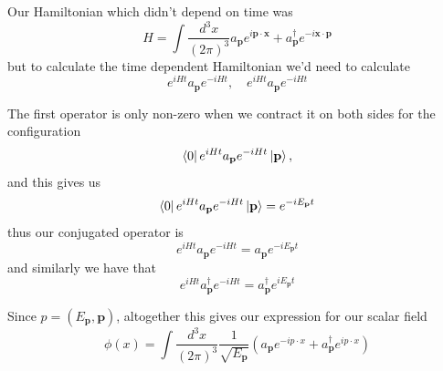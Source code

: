 \documentclass[11pt, oneside]{article}   	%
\theoremstyle{newline}
\theoremstyle{newline}
\theoremstyle{newline}
\theoremstyle{newline}
\theoremstyle{newline}
\begin{document}
Our Hamiltonian which didn't depend on time was\[ H = \int \frac{d^3 x }{(2 \pi)^3} a_{\mathbf{p}}e^{i \mathbf{p} \cdot \mathbf{x}}+ a_{\mathbf{p}}^\dagger e^{-i \mathbf{x} \cdot \mathbf{p}}
\] 
but to calculate the time dependent Hamiltonian we'd need to calculate 
\[ e^{i H t }a_\mathbf{p} e^{ - i H t}, \quad e^{iHt} a_\mathbf{p}e^{ - i H t} \]

The first operator is only non-zero when we contract it on both sides for the configuration 
\[ \bra{0}e^{i H t}a_{\mathbf{p}} e^{ - iHt} \ket{\mathbf{p}},\]  and this gives us 
\[ \bra{0}e^{iH t }a_{\mathbf{p}}e^{- iH t }\ket{\mathbf{p}} = e^{ - i E_{\mathbf{p}} t} \] 
thus our conjugated operator is 
\[ e^{iHt}a_\mathbf{p}e^{ - iHt}  = a_{\mathbf{p}}e^{ -i E_\mathbf{p}t} \] and similarly we have that 
\[ e^{ iHt}a_\mathbf{p}^\dagger e^{ - iHt}  = a_{\mathbf{p}}^\dagger e^{i E_\mathbf{p} t} \] 

Since $ p  = (E_\mathbf{p}, \mathbf{p})$, altogether this gives our expression for our scalar field 
\[
\phi (x) = \int \frac{d^3 x }{(2 \pi)^3} \frac{1}{\sqrt{E_\mathbf{p}}} \left( a_\mathbf{p}e^{ -i p \cdot x} + a_\mathbf{p}^\dagger e^{i p \cdot x} \right) 
\]


\pagebreak 
\end{document}
